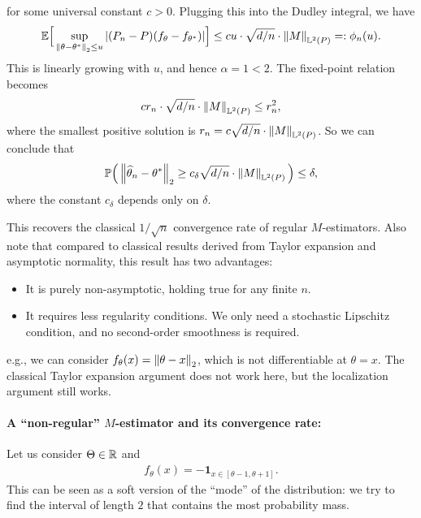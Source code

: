 \documentclass[11pt,letterpaper]{article}
\numberwithin{theorem}{lecture}
\numberwithin{proposition}{lecture}
\numberwithin{lemma}{lecture}
\numberwithin{claim}{lecture}
\numberwithin{corollary}{lecture}
\numberwithin{definition}{lecture}
\numberwithin{conjecture}{lecture}
\numberwithin{remark}{lecture}
\numberwithin{example}{lecture}
\numberwithin{equation}{lecture}
\begin{document}
for some universal constant $c > 0$. Plugging this into the Dudley integral, we have
\begin{align*}
  {\mathbb{E}} \Big[ \sup_{\left\| \theta - {\theta^*}\right\|_{2} \leq u} |(P_n - P) (f_\theta - f_{{\theta^*}})| \Big] \leq c u \cdot \sqrt{d/n} \cdot \left\| M\right\|_{\mathbb{L}^2 (P)} =: \phi_n (u).
\end{align*}
This is linearly growing with $u$, and hence $\alpha = 1 < 2$. The fixed-point relation becomes
\begin{align*}
  c r_n \cdot \sqrt{d/n} \cdot \left\| M\right\|_{\mathbb{L}^2 (P)} \leq r_n^2,
\end{align*}
where the smallest positive solution is $r_n = c \sqrt{d/n} \cdot \left\| M\right\|_{\mathbb{L}^2 (P)}$. So we can conclude that
\begin{align*}
  {\mathbb{P}} \Big( \left\| \widehat{\theta}_n - {\theta^*}\right\|_{2} \geq c_\delta \sqrt{d/n} \cdot \left\| M\right\|_{\mathbb{L}^2 (P)} \Big) \leq \delta,
\end{align*}
where the constant $c_\delta$ depends only on $\delta$.

This recovers the classical $1/\sqrt{n}$ convergence rate of regular $M$-estimators. Also note that compared to classical results derived from Taylor expansion and asymptotic normality, this result has two advantages:
\begin{itemize}
  \item It is purely non-asymptotic, holding true for any finite $n$.
  \item It requires less regularity conditions. We only need a stochastic Lipschitz condition, and no second-order smoothness is required.
\end{itemize}
e.g., we can consider $f_\theta (x) = \left\| \theta - x\right\|_{2}$, which is not differentiable at $\theta = x$. The classical Taylor expansion argument does not work here, but the localization argument still works.

\paragraph{A ``non-regular'' $M$-estimator and its convergence rate:} Let us consider $\Theta \in \mathbb{R}$ and
\begin{align*}
  f_\theta (x) = - \bm{1}_{x \in [\theta - 1, \theta + 1]}.
\end{align*}
This can be seen as a soft version of the ``mode'' of the distribution: we try to find the interval of length $2$ that contains the most probability mass.
\end{document}
